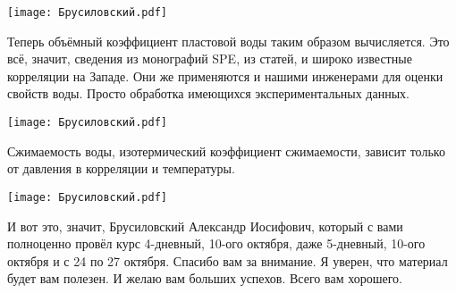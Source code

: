 \documentclass[main.tex]{subfiles}
\begin{document}
\begin{center}
\texttt{[image: Брусиловский.pdf]}
\end{center}

Теперь объёмный коэффициент пластовой воды таким образом вычисляется.
Это всё, значит, сведения из монографий SPE, из статей, и широко известные корреляции на Западе.
Они же применяются и нашими инженерами для оценки свойств воды.
Просто обработка имеющихся экспериментальных данных.

\begin{center}
\texttt{[image: Брусиловский.pdf]}
\end{center}

Сжимаемость воды, изотермический коэффициент сжимаемости, зависит только от давления в корреляции и температуры.

\begin{center}
\texttt{[image: Брусиловский.pdf]}
\end{center}

И вот это, значит, Брусиловский Александр Иосифович, который с вами полноценно провёл курс 4-дневный, 10-ого октября, даже 5-дневный, 10-ого октября и с 24 по 27 октября.
Спасибо вам за внимание. Я уверен, что материал будет вам полезен.
И желаю вам больших успехов. Всего вам хорошего.
\end{document}

